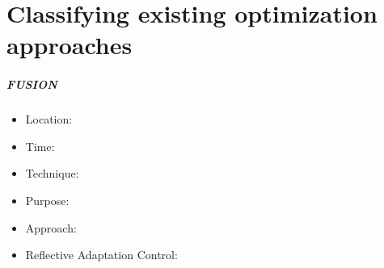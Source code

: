 \newpage
\section{Classifying existing optimization approaches}
\label{ch:Existing}




\subparagraph*{FUSION}
\begin{itemize}
    \item Location:
    \item Time:
    \item Technique:
    \item Purpose:
    \item Approach:
    \item Reflective Adaptation Control:
\end{itemize}